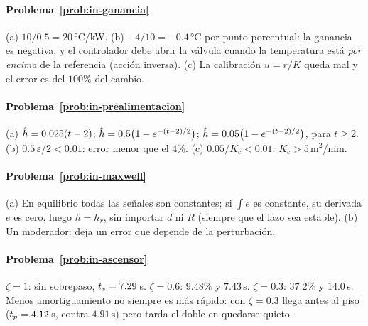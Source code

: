 \paragraph{Problema~\ref{prob:in-ganancia}}
(a) $10/0.5=20$\,°C/kW. (b) $-4/10=-0.4$\,°C por punto porcentual: la ganancia es negativa, y el controlador debe abrir la válvula cuando la temperatura está \emph{por encima} de la referencia (acción inversa). (c) La calibración $u=r/K$ queda mal y el error es del $100\%$ del cambio.

\paragraph{Problema~\ref{prob:in-prealimentacion}}
(a) $\hat{h}=0.025(t-2)$; $\hat{h}=0.5\bigl(1-e^{-(t-2)/2}\bigr)$; $\hat{h}=0.05\bigl(1-e^{-(t-2)/2}\bigr)$, para $t\ge2$. (b) $0.5\,\varepsilon/2<0.01$: error menor que el $4\%$. (c) $0.05/K_c<0.01$: $K_c>5$\,m$^2$/min.

\paragraph{Problema~\ref{prob:in-maxwell}}
(a) En equilibrio todas las señales son constantes; si $\int e$ es constante, su derivada $e$ es cero, luego $h=h_r$, sin importar $d$ ni $R$ (siempre que el lazo sea estable). (b) Un moderador: deja un error que depende de la perturbación.

\paragraph{Problema~\ref{prob:in-ascensor}}
$\zeta=1$: sin sobrepaso, $t_s=7.29$\,s. $\zeta=0.6$: $9.48\%$ y $7.43$\,s. $\zeta=0.3$: $37.2\%$ y $14.0$\,s. Menos amortiguamiento no siempre es más rápido: con $\zeta=0.3$ llega antes al piso ($t_p=4.12$\,s, contra $4.91$\,s) pero tarda el doble en quedarse quieto.

\respuestaspausas

